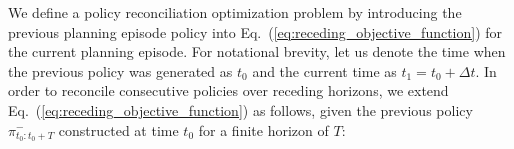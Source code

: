 \documentclass[letterpaper]{article} %
\newcommand{\phdone}[1]{} %
\newcommand{\argmax}{\mathop{\mathrm{argmax}}}
\begin{document}
\phdone{Receding Horizon Planning Re-formulation}
We define a policy reconciliation optimization problem by introducing the previous planning episode policy into Eq.~(\ref{eq:receding_objective_function}) for the current planning episode.
For notational brevity, let us denote the time when the previous policy was generated as $t_0$ and the current time as $t_1 = t_0 + \Delta t$.
%
%
%
%
In order to reconcile consecutive policies over receding horizons, we extend Eq.~(\ref{eq:receding_objective_function}) as follows, given the previous policy $\pi_{t_0:t_0+T}^-$ constructed at time $t_0$ for a finite horizon of $T$:
%
\end{document}
